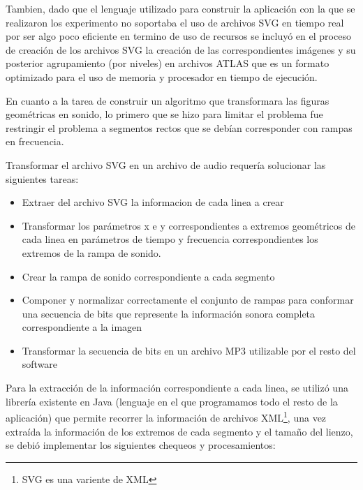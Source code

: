 \documentclass{article}
\begin{document}
    Tambien, dado que el lenguaje utilizado para construir la aplicación con la que se realizaron los experimento no soportaba el uso de archivos SVG en tiempo real por ser algo poco eficiente en termino de uso de recursos se incluyó en el proceso de creación de los archivos SVG la creación de las correspondientes imágenes y su posterior agrupamiento (por niveles) en archivos ATLAS que es un formato optimizado para el uso de memoria y procesador en tiempo de ejecución.
    
    En cuanto a la tarea de construir un algoritmo que transformara las figuras geométricas en sonido, lo primero que se hizo para limitar el problema fue restringir el problema a segmentos rectos que se debían corresponder con rampas en frecuencia.
    
    Transformar el archivo SVG en un archivo de audio requería solucionar las siguientes tareas:
    
    \begin{itemize}
        \item Extraer del archivo SVG la informacion de cada linea a crear
        \item Transformar los parámetros x e y correspondientes a extremos geométricos de cada linea en parámetros de tiempo y frecuencia correspondientes los extremos de la rampa de sonido.
        \item Crear la rampa de sonido correspondiente a cada segmento
        \item Componer y normalizar correctamente el conjunto de rampas para conformar una secuencia de bits que represente la información sonora completa correspondiente a la imagen
        \item Transformar la secuencia de bits en un archivo MP3 utilizable por el resto del software
    \end{itemize}
    
    Para la extracción de la información correspondiente a cada linea, se utilizó una librería existente en Java (lenguaje en el que programamos todo el resto de la aplicación) que permite recorrer la información de archivos XML\footnote{SVG es una variente de XML}, una vez extraída la información de los extremos de cada segmento y el tamaño del lienzo, se debió implementar los siguientes chequeos y procesamientos:
    
\end{document}
